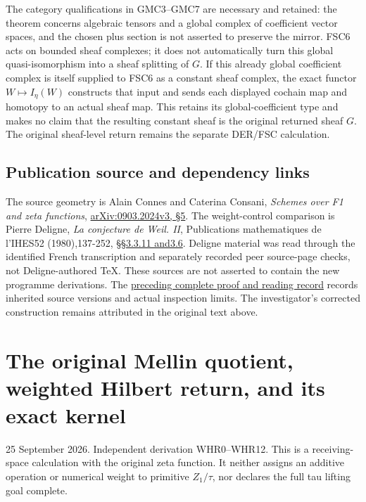 The category qualifications in GMC3--GMC7 are necessary and retained:
the theorem concerns algebraic tensors and a global complex of
coefficient vector spaces, and the chosen plus section is not asserted
to preserve the mirror. FSC6 acts on bounded sheaf complexes; it does
not automatically turn this global quasi-isomorphism into a sheaf
splitting of \(G\). If this already global coefficient complex is itself
supplied to FSC6 as a constant sheaf complex, the exact functor
\(W\mapsto I_\eta(W)\) constructs that input and sends each displayed
cochain map and homotopy to an actual sheaf map. This retains its
global-coefficient type and makes no claim that the resulting constant
sheaf is the original returned sheaf \(G\). The original sheaf-level
return remains the separate DER/FSC calculation.

\section{Publication source and dependency
links}\label{publication-source-and-dependency-links-7}

The source geometry is Alain Connes and Caterina Consani, \emph{Schemes
over F1 and zeta functions},
\href{https://arxiv.org/abs/0903.2024v3}{arXiv:0903.2024v3, §5}. The
weight-control comparison is Pierre Deligne, \emph{La conjecture de
Weil. II}, Publications mathematiques de l'IHES52 (1980),137-252,
\href{https://www.numdam.org/item/PMIHES_1980__52__137_0/}{§§3.3.11
and3.6}. Deligne material was read through the identified French
transcription and separately recorded peer source-page checks, not
Deligne-authored TeX. These sources are not asserted to contain the new
programme derivations. The
\href{https://github.com/KokunoYumeto/zeta-function-research-reader/blob/36a82ecca98addb8a98b48204e349737856c7223/workbenches/splitzero-tandem/continuations/20260924-cohomology-weight-and-character-lifts/BUILD_AND_REVIEW.md}{preceding
complete proof and reading record} records inherited source versions and
actual inspection limits. The investigator's corrected construction
remains attributed in the original text above.

\chapter{The original Mellin quotient, weighted Hilbert return, and its
exact
kernel}\label{the-original-mellin-quotient-weighted-hilbert-return-and-its-exact-kernel}

25 September 2026. Independent derivation WHR0--WHR12. This is a
receiving-space calculation with the original zeta function. It neither
assigns an additive operation or numerical weight to primitive
\(Z_1/\tau\), nor declares the full tau lifting goal complete.

